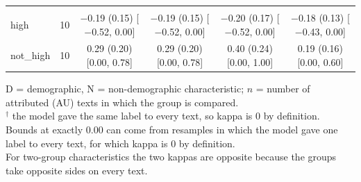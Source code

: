 \begin{table}[t]
\begin{tabular}{@{}lr*{4}{c}@{}}
\addlinespace
\multicolumn{6}{@{}l}{\textit{Religion (N)}} \\
\quad high & 10 & \makecell{$-$0.19 (0.15)\\ {[}$-$0.52, 0.00{]}} & \makecell{$-$0.19 (0.15)\\ {[}$-$0.52, 0.00{]}} & \makecell{$-$0.20 (0.17)\\ {[}$-$0.52, 0.00{]}} & \makecell{$-$0.18 (0.13)\\ {[}$-$0.43, 0.00{]}} \\
\quad not\_high & 10 & \makecell{0.29 (0.20)\\ {[}0.00, 0.78{]}} & \makecell{0.29 (0.20)\\ {[}0.00, 0.78{]}} & \makecell{0.40 (0.24)\\ {[}0.00, 1.00{]}} & \makecell{0.19 (0.16)\\ {[}0.00, 0.60{]}} \\
\bottomrule
\end{tabular}
\par\smallskip
\begin{minipage}{\linewidth}
\footnotesize
D = demographic, N = non-demographic characteristic; $n$ = number of attributed (\ac{AU}) texts in which the group is compared. \\
$^\dagger$ the model gave the same label to every text, so kappa is 0 by definition. \\
Bounds at exactly 0.00 can come from resamples in which the model gave one label to every text, for which kappa is 0 by definition. \\
For two-group characteristics the two kappas are opposite because the groups take opposite sides on every text.
\end{minipage}
\end{table}

